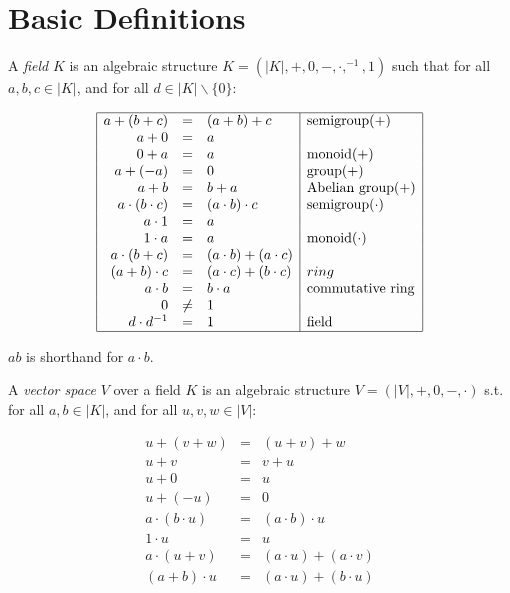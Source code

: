 \section{Basic Definitions}

\label{sec:basic-definitions}

\begin{definition}[Field]

\cite{henglein2016autodiff} A \emph{field} $K$ is an algebraic structure $K =
(|K|, +, 0, -, \cdot, ^{-1}, 1)$ such that for all $a, b, c \in |K|$, and for
all $ d \in |K|\backslash\{0\}$:

\[
\begin{array}{|rcl|l|} \hline
a + (b + c) & = & (a + b) + c & \text{semigroup}(+) \\
a + 0 & = & a & \\
0 + a & = & a & \text{monoid}(+) \\
a + (-a) & = & 0 & \text{group}(+) \\
a + b & = & b + a & \text{Abelian group}(+) \\
a \cdot (b \cdot c) & = & (a \cdot b) \cdot c & \text{semigroup}(\cdot) \\
a \cdot 1 & = & a & \\
1 \cdot a & = & a & \text{monoid}(\cdot) \\
a \cdot (b + c) & = & (a \cdot b) + (a \cdot c) & \\
(a + b) \cdot c & = & (a \cdot c) + (b \cdot c) & ring \\
a \cdot b & = & b \cdot a & \text{commutative ring} \\
0 & \neq & 1 & \\
d \cdot d^{-1} & = & 1 & \text{field} \\ \hline
\end{array}
\]
\end{definition}

\begin{notation}

$ab$ is shorthand for $a \cdot b$.

\end{notation}

\begin{definition}

\cite{henglein2016autodiff} A \emph{vector space} $V$ over a field $K$ is an
algebraic structure $V = (|V|, +, 0, -, \cdot)$ s.t. for all $a, b \in |K|$,
and for all $u, v, w \in |V|$:

\begin{eqnarray}
u + (v + w) & = & (u + v) + w \\
u + v & = & v + u \\
u + 0 & = & u \\
u + (-u) & = & 0 \\
a \cdot (b \cdot u) & = & (a \cdot b) \cdot u \\
1 \cdot u & = & u \\
a \cdot (u + v) & = & (a \cdot u) + (a \cdot v) \\
(a + b) \cdot u & = & (a \cdot u) + (b \cdot u) 
\end{eqnarray}
\end{definition}

